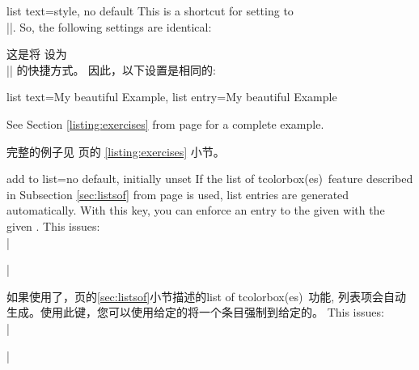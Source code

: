 \begin{docTcbKey}[][doc new=2014-09-19]{list text}{=}{style, no default}
This is a shortcut for setting  to\\
|\protect\numberline{\thetcbcounter}|.
So, the following settings are identical:

这是将  设为\\
|\protect\numberline{\thetcbcounter}| 的快捷方式。
因此，以下设置是相同的:
\begin{dispListing}
list text={My beautiful Example},
list entry={\protect\numberline{\thetcbcounter}My beautiful Example}
\end{dispListing}
See Section \ref{listing:exercises} from page \pageref{listing:exercises}
for a complete example.

完整的例子见 \pageref{listing:exercises} 页的 \ref{listing:exercises} 小节。
\end{docTcbKey}



\begin{docTcbKey}{add to list}{=}{no default, initially unset}
If the \flqq list of tcolorbox(es)\frqq\ feature described in Subsection
\ref{sec:listsof} from page \pageref{sec:listsof} is used, list entries are
generated automatically. With this key, you can enforce an entry to the
given  with the given .
This issues:\\
|\addcontentsline|

如果使用了，\pageref{sec:listsof}页的\ref{sec:listsof}小节描述的\flqq list of tcolorbox(es)\frqq\ 功能, 列表项会自动生成。使用此键，您可以使用给定的将一个条目强制到给定的。
This issues:\\
|\addcontentsline|
\end{docTcbKey}




